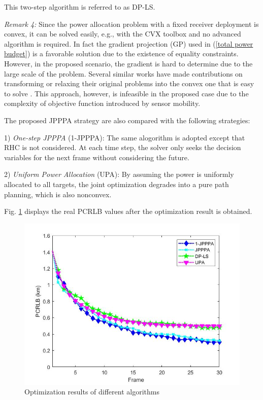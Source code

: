 \documentclass[12pt,journal,draftclsnofoot,onecolumn]{IEEEtran}
\begin{document}
This two-step algorithm is referred to as DP-LS. %

\emph{Remark 4:} Since the power allocation problem with a fixed receiver deployment is convex, it can be solved easily, e.g., with the CVX toolbox and no advanced algorithm is required. In fact the gradient projection (GP) used in (\ref{total power budget}) is a favorable solution due to the existence of equality constraints. However, in the proposed scenario, the gradient is hard to determine due to the large scale of the problem. Several similar works have made contributions on transforming or relaxing their original problems into the convex one that is easy to solve%
. This approach, however, is infeasible in the proposed case due to the complexity of objective function introduced by sensor mobility.

The proposed JPPPA strategy are also compared with the following strategies:

1) \emph{One-step JPPPA} (1-JPPPA): The same alogorithm is adopted except that RHC is not considered. At each time step, the solver only seeks the decision variables for the next frame without considering the future.

2) \emph{Uniform Power Allocation} (UPA): By assuming the power is uniformly allocated to all targets, the joint optimization degrades into a pure path planning, which is also nonconvex.

Fig. \ref{fig:PCRLB} displays the real PCRLB values after the optimization result is obtained.

\begin{figure}
	\centering
	\includegraphics[scale=0.36]{PCRLB.jpg}
	\caption{Optimization results of different algorithms}
	\label{fig:PCRLB}
\end{figure}
\end{document}
